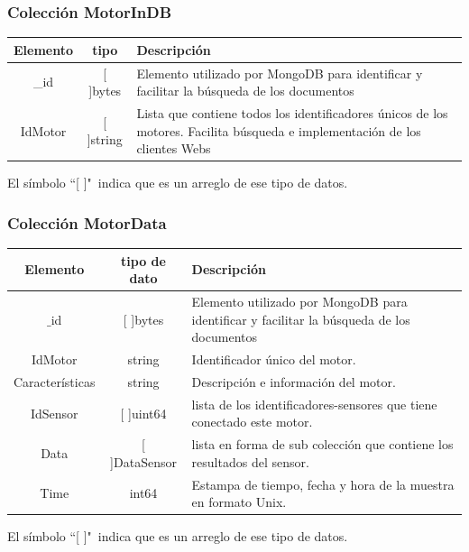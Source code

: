 \documentclass{beamer}
\begin{document}
\begin{frame}
    \frametitle{Colección MotorInDB}
    \begin{table}[ht]
        \begin{center}
            \begin{tabular}{|c|c|p{7cm}|}
                \hline
                Elemento & tipo     & Descripción \\\hline\hline
                \_id      & [ ]bytes  & Elemento utilizado por MongoDB para
                identificar y facilitar la búsqueda de los documentos\\\hline
                IdMotor  & [ ]string & Lista que contiene todos los identificadores
                únicos de los motores. Facilita búsqueda e implementación de los
                clientes Webs\\\hline
            \end{tabular}

            \vspace{0.5cm}
            El símbolo ``[ ]"\ indica que es un arreglo de ese tipo de datos.
        \end{center}
    \end{table}

\end{frame}

\begin{frame}
    \frametitle{Colección MotorData}
    \begin{table}[ht]
        \begin{center}
            \begin{tabular}{|c|c|p{5cm}|}
                \hline
                Elemento        & tipo de dato & Descripción \\\hline\hline
                $\_$id      & [ ]bytes  & Elemento utilizado por MongoDB para
                identificar y facilitar la búsqueda de los documentos\\\hline
                IdMotor         & string   & Identificador único del motor.\\\hline
                Características & string   & Descripción e información del motor.\\\hline
                IdSensor        & [ ]uint64 & lista de los identificadores-sensores
                que tiene conectado este motor.\\\hline
                Data            & [ ]DataSensor & lista en forma de sub colección
                que contiene los resultados del sensor.\\\hline
                Time            & int64  & Estampa de tiempo, fecha y hora de la muestra en formato Unix.\\\hline
            \end{tabular}

            \vspace{0.5cm}
            El símbolo ``[  ]"\  indica que es un arreglo de ese tipo de datos.
        \end{center}
    \end{table}
\end{frame}
\end{document}
